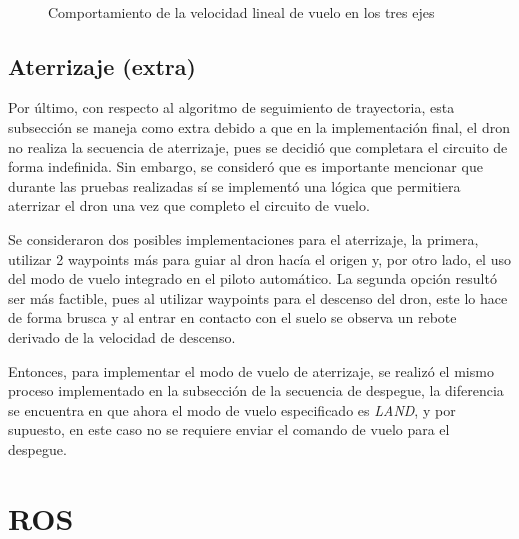 \begin{figure}[ht]
    \centering
    \hfill
    \\
    \hfill

    \caption{Comportamiento de la velocidad lineal de vuelo en los tres ejes}
    \label{fig:pymav_missionv}
\end{figure}


\subsection{Aterrizaje (extra)}

Por último, con respecto al algoritmo de seguimiento de trayectoria, esta subsección se maneja como extra debido a que en la implementación final, el dron no realiza la secuencia de aterrizaje, pues se decidió que completara el circuito de forma indefinida. Sin embargo, se consideró que es importante mencionar que durante las pruebas realizadas sí se implementó una lógica que permitiera aterrizar el dron una vez que completo el circuito de vuelo. 

Se consideraron dos posibles implementaciones para el aterrizaje, la primera, utilizar 2 waypoints más para guiar al dron hacía el origen y, por otro lado, el uso del modo de vuelo integrado en el piloto automático. La segunda opción resultó ser más factible, pues al utilizar waypoints para el descenso del dron, este lo hace de forma brusca y al entrar en contacto con el suelo se observa un rebote derivado de la velocidad de descenso.

Entonces, para implementar el modo de vuelo de aterrizaje, se realizó el mismo proceso implementado en la subsección de la secuencia de despegue, la diferencia se encuentra en que ahora el modo de vuelo especificado es \textit{LAND}, y por supuesto, en este caso no se requiere enviar el comando de vuelo para el despegue.


\section{ROS}







